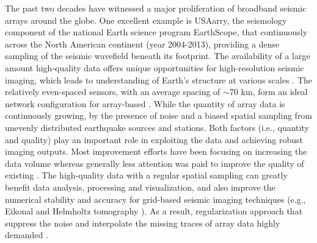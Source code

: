 The past two decades have witnessed a major proliferation of broadband seismic arrays around the globe.  One excellent example is USAarry, the seismology component of the national Earth science program EarthScope, that  continuously across the North American continent (year 2004-2013), providing a dense sampling of the seismic wavefield beneath its footprint. The availability of a large amount  high-quality data offers unique opportunities for high-resolution seismic imaging, which leads to   understanding of  Earth's structure at various scales \cite{van2005surface,moschetti2007surface,yang2008structure,lin2009eikonal,yuan2010lithospheric,sigloch2011mantle,porritt2014seismic,schaeffer2014imaging,schmandt2014p,bao2016imaging,burdick2017model}. The relatively even-spaced sensors, with an average spacing of $ \sim $70 km, form an ideal network configuration for   array-based  \cite{rost2002array,gu2010arrays}. While the quantity of array data is continuously growing,  by the presence of noise and a biased spatial sampling  from unevenly distributed earthquake sources and stations. Both factors (i.e., quantity and quality) play an important role in exploiting the data and achieving robust imaging outputs. Most  improvement efforts have been focusing on increasing the data volume whereas generally less attention was paid to improve the quality of existing . The high-quality data with a regular spatial sampling can greatly benefit data analysis, processing and visualization, and also improve the numerical stability and accuracy for grid-based seismic imaging techniques (e.g., Eikonal \cite{lin2009eikonal} and Helmholtz tomography \cite{lin2011helmholtz}). As a result, regularization approach that suppress the noise and interpolate the missing traces of array data  highly demanded \cite{mostafa2016geo,mostafa2016bssa,schneider2017improvement}. 

